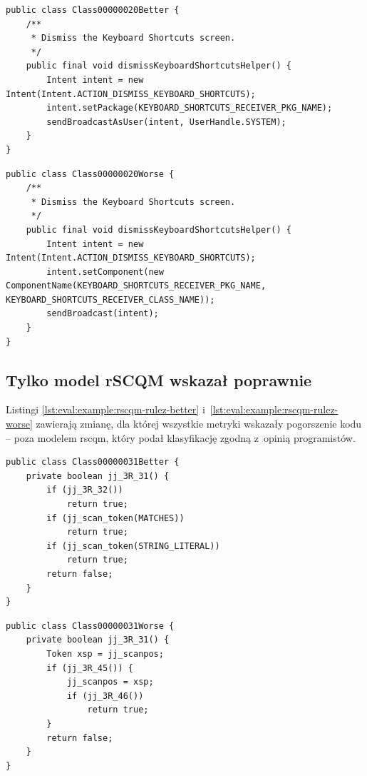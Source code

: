 \documentclass[twoside]{praca}
\begin{document}
\begin{lstlisting}[frame=single,caption={Każda z~metryk nie ma zdania -- przykład kodu -- wersja lepsza według programistów},captionpos=b,label={lst:eval:example:nono-better}]
public class Class00000020Better {
    /** 
     * Dismiss the Keyboard Shortcuts screen. 
     */
    public final void dismissKeyboardShortcutsHelper() {
        Intent intent = new Intent(Intent.ACTION_DISMISS_KEYBOARD_SHORTCUTS);
        intent.setPackage(KEYBOARD_SHORTCUTS_RECEIVER_PKG_NAME);
        sendBroadcastAsUser(intent, UserHandle.SYSTEM);
    }
}
\end{lstlisting}

\pagebreak

\begin{lstlisting}[frame=single,caption={Każda z~metryk nie ma zdania -- przykład kodu -- wersja gorsza według programistów},captionpos=b,label={lst:eval:example:nono-worse}]
public class Class00000020Worse {
    /** 
     * Dismiss the Keyboard Shortcuts screen. 
     */
    public final void dismissKeyboardShortcutsHelper() {
        Intent intent = new Intent(Intent.ACTION_DISMISS_KEYBOARD_SHORTCUTS);
        intent.setComponent(new ComponentName(KEYBOARD_SHORTCUTS_RECEIVER_PKG_NAME, KEYBOARD_SHORTCUTS_RECEIVER_CLASS_NAME));
        sendBroadcast(intent);
    }
}
\end{lstlisting}

\subsection{Tylko model rSCQM wskazał poprawnie}
Listingi \ref{lst:eval:example:rscqm-rulez-better} i~\ref{lst:eval:example:rscqm-rulez-worse} zawierają zmianę, dla której wszystkie metryki wskazały pogorszenie kodu -- poza modelem \gls{rscqm}, który podał klasyfikację zgodną z~opinią programistów.

\begin{lstlisting}[frame=single,caption={Tylko rSCQM wskazał poprawę jakości -- przykład kodu -- wersja lepsza według programistów},captionpos=b,label={lst:eval:example:rscqm-rulez-better}]
public class Class00000031Better {
    private boolean jj_3R_31() {
        if (jj_3R_32())
            return true;
        if (jj_scan_token(MATCHES))
            return true;
        if (jj_scan_token(STRING_LITERAL))
            return true;
        return false;
    }
}
\end{lstlisting}

\begin{lstlisting}[frame=single,caption={Tylko rSCQM wskazał poprawę jakości -- przykład kodu -- wersja gorsza według programistów},captionpos=b,label={lst:eval:example:rscqm-rulez-worse}]
public class Class00000031Worse {
    private boolean jj_3R_31() {
        Token xsp = jj_scanpos;
        if (jj_3R_45()) {
            jj_scanpos = xsp;
            if (jj_3R_46())
                return true;
        }
        return false;
    }
}
\end{lstlisting}
\end{document}
